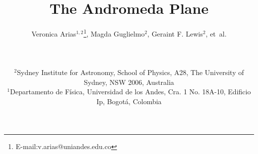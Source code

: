 \documentclass[useAMS,usenatbib]{mn2e}
\begin{document}

\title[The Andromeda plane]{The Andromeda Plane}
\author[Arias et al.]{
{\parbox{\textwidth}{
Veronica Arias$^{1,2}$\thanks{E-mail:v.arias@uniandes.edu.co}, 
Magda Guglielmo$^2$,
Geraint F. Lewis$^2$, 
et~al.\\}}
\vspace{0.1cm}\\
\parbox{\textwidth}{
$^2$Sydney Institute for Astronomy, School of Physics, A28, The University of Sydney, NSW 2006, Australia \\
$^1$Departamento de F\'isica, Universidad de los Andes, Cra. 1 No. 18A-10, Edificio Ip, Bogot\'a, Colombia\\
}}
\end{document}

